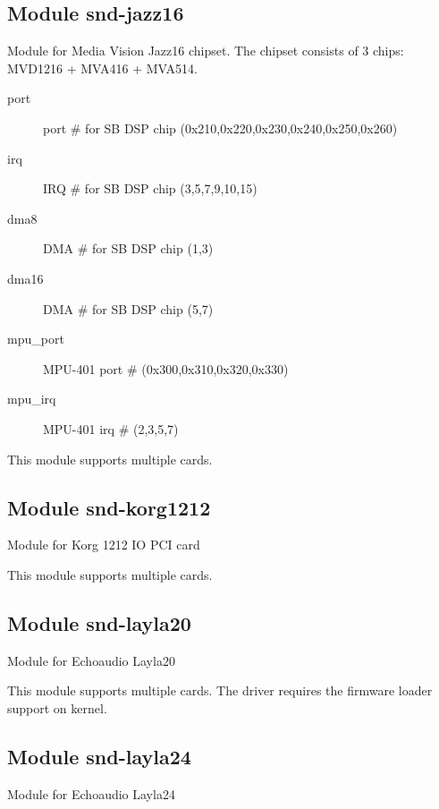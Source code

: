 \documentclass[a4paper,8pt,english]{sphinxmanual}
\begin{document}
\subsection{Module snd-jazz16}
\label{sound/alsa-configuration:module-snd-jazz16}
Module for Media Vision Jazz16 chipset. The chipset consists of 3 chips:
MVD1216 + MVA416 + MVA514.
\begin{description}
\item[{port}] \leavevmode
port \# for SB DSP chip (0x210,0x220,0x230,0x240,0x250,0x260)

\item[{irq}] \leavevmode
IRQ \# for SB DSP chip (3,5,7,9,10,15)

\item[{dma8}] \leavevmode
DMA \# for SB DSP chip (1,3)

\item[{dma16}] \leavevmode
DMA \# for SB DSP chip (5,7)

\item[{mpu\_port}] \leavevmode
MPU-401 port \# (0x300,0x310,0x320,0x330)

\item[{mpu\_irq}] \leavevmode
MPU-401 irq \# (2,3,5,7)

\end{description}

This module supports multiple cards.


\subsection{Module snd-korg1212}
\label{sound/alsa-configuration:module-snd-korg1212}
Module for Korg 1212 IO PCI card

This module supports multiple cards.


\subsection{Module snd-layla20}
\label{sound/alsa-configuration:module-snd-layla20}
Module for Echoaudio Layla20

This module supports multiple cards.
The driver requires the firmware loader support on kernel.


\subsection{Module snd-layla24}
\label{sound/alsa-configuration:module-snd-layla24}
Module for Echoaudio Layla24
\end{document}
